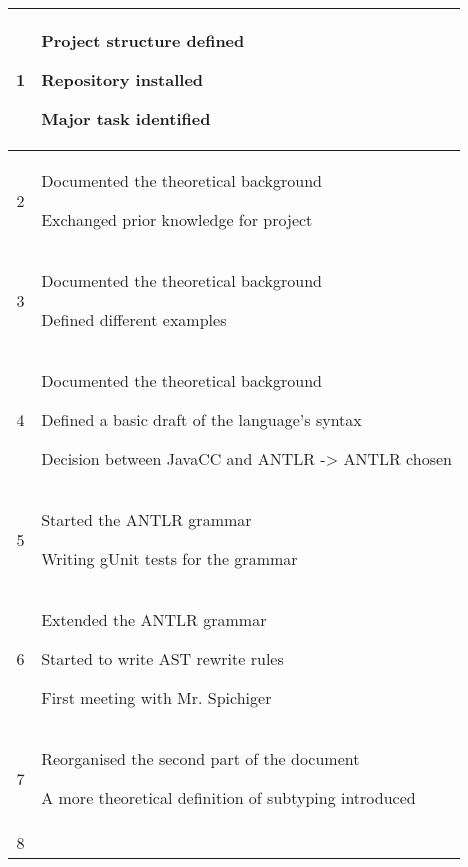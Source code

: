 \begin{center}
\begin{longtable}{|c|p{12cm}|}
1 &
\begin{journal}
	\item Project structure defined
	\item Repository installed
	\item Major task identified
\end{journal}
\\ \hline
2 &
\begin{journal}
	\item Documented the theoretical background
	\item Exchanged prior knowledge for project
\end{journal}
\\ \hline
3 &
\begin{journal}
	\item Documented the theoretical background
	\item Defined different examples
\end{journal}
\\ \hline
4 &
\begin{journal}
	\item Documented the theoretical background
	\item Defined a basic draft of the language's syntax
	\item Decision between JavaCC and ANTLR -> ANTLR chosen
\end{journal}
\\ \hline
5 &
\begin{journal}
	\item Started the ANTLR grammar
	\item Writing gUnit tests for the grammar
\end{journal}
\\ \hline
6 &
\begin{journal}
	\item Extended the ANTLR grammar
	\item Started to write AST rewrite rules
	\item First meeting with Mr. Spichiger
\end{journal}
\\ \hline
7 &
\begin{journal}
	\item Reorganised the second part of the document
	\item A more theoretical definition of subtyping introduced
\end{journal}
\\ \hline
8 &
\begin{journal}

\end{journal}
\end{longtable}
\end{center}
